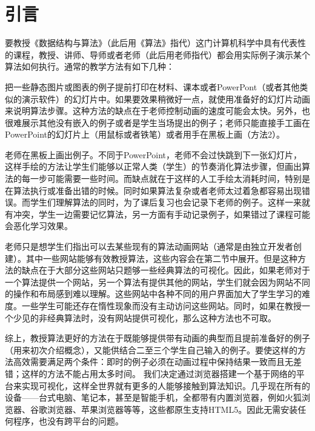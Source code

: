 \chapter{引言}
\begin{sectext}
要教授《数据结构与算法》（此后用《算法》指代）这门计算机科学中具有代表性的课程，教授、讲师、导师或者老师（此后用老师指代）都会用实际例子演示某个算法如何执行。通常的教学方法有如下几种：
\begin{itemlist}
\item 把一些静态图片或图表的例子提前打印在材料、课本或者PowerPont（或者其他类似的演示软件）的幻灯片中。如果要效果稍微好一点，就使用准备好的幻灯片动画来说明算法步骤。这种方法的缺点在于老师控制动画的速度可能会太快。另外，也很难展示其他没有嵌入的例子或者是学生当场提出的例子；老师只能直接手工画在PowerPoint的幻灯片上（用鼠标或者铁笔）或者用手在黑板上画（方法2）。

\item 老师在黑板上画出例子。不同于PowerPoint，老师不会过快跳到下一张幻灯片，这样手绘的方法让学生们能够以正常人类（学生）的节奏消化算法步骤，但画出算法的每一步可能需要一些时间。而缺点就在于这样的人工手绘太消耗时间，特别是在算法执行或准备出错的时候。同时如果算法复杂或者老师太过着急都容易出现错误。而学生们理解算法的同时，为了课后复习也会记录下老师的例子。这样一来就有冲突，学生一边需要记忆算法，另一方面有手动记录例子，如果错过了课程可能会恶化学习效果。

\item 老师只是想学生们指出可以去某些现有的算法动画网站（通常是由独立开发者创建）。其中一些网站能够有效教授算法，这些内容会在第二节中展开。但是这种方法的缺点在于大部分这些网站只题够一些经典算法的可视化。因此，如果老师对于一个算法提供一个网站，另一个算法有提供其他的网站，学生们就会因为网站不同的操作和布局感到难以理解。这些网站中各种不同的用户界面加大了学生学习的难度。一些学生可能还存在惰性现象而没有主动访问这些网站。同时，如果在教授一个少见的非经典算法时，没有网站提供可视化，那么这种方法也不可取。
\end{itemlist}

综上，教授算法更好的方法在于既能够提供带有动画的典型而且提前准备好的例子（用来初次介绍概念），又能供结合二至三个学生自己输入的例子。要使这样的方法高效需要满足两个条件：即时的例子必须在动画过程中保持结果一致而且无差错；这样的方法不能占用太多时间。
我们决定通过浏览器搭建一个基于网络的平台来实现可视化，这样全世界就有更多的人能够接触到算法知识。几乎现在所有的设备——台式电脑、笔记本，甚至是智能手机，全都带有内置浏览器，例如火狐浏览器、谷歌浏览器、苹果浏览器等等，这些都原生支持HTML5。因此无需安装任何程序，也没有跨平台的问题。


\end{sectext}
